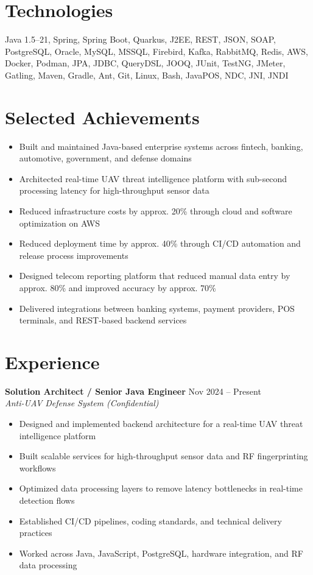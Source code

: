 \documentclass[10pt,a4paper]{article}
\begin{document}
\section*{Technologies}

Java 1.5--21, Spring, Spring Boot, Quarkus, J2EE, REST, JSON, SOAP, PostgreSQL, Oracle, MySQL, MSSQL, Firebird, Kafka, RabbitMQ, Redis, AWS, Docker, Podman, JPA, JDBC, QueryDSL, JOOQ, JUnit, TestNG, JMeter, Gatling, Maven, Gradle, Ant, Git, Linux, Bash, JavaPOS, NDC, JNI, JNDI

\section*{Selected Achievements}

\begin{itemize}
\item Built and maintained Java-based enterprise systems across fintech, banking, automotive, government, and defense domains
\item Architected real-time UAV threat intelligence platform with sub-second processing latency for high-throughput sensor data
\item Reduced infrastructure costs by approx. 20\% through cloud and software optimization on AWS
\item Reduced deployment time by approx. 40\% through CI/CD automation and release process improvements
\item Designed telecom reporting platform that reduced manual data entry by approx. 80\% and improved accuracy by approx. 70\%
\item Delivered integrations between banking systems, payment providers, POS terminals, and REST-based backend services
\end{itemize}

\section*{Experience}

\textbf{Solution Architect / Senior Java Engineer} \hfill Nov 2024 -- Present \\
\textit{Anti-UAV Defense System (Confidential)}

\begin{itemize}
\item Designed and implemented backend architecture for a real-time UAV threat intelligence platform
\item Built scalable services for high-throughput sensor data and RF fingerprinting workflows
\item Optimized data processing layers to remove latency bottlenecks in real-time detection flows
\item Established CI/CD pipelines, coding standards, and technical delivery practices
\item Worked across Java, JavaScript, PostgreSQL, hardware integration, and RF data processing
\end{itemize}
\end{document}
